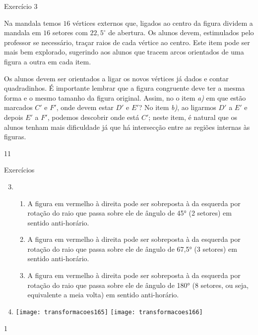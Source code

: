 \begin{sugestions}{Exercício 3}
{
Na mandala temos $16$ vértices externos que, ligados ao centro da figura dividem a mandala em $16$ setores com $22{,}5^{\circ}$ de abertura. Os alunos devem, estimulados pelo professor se necessário, traçar raios de cada vértice ao centro. Este item pode ser mais bem explorado, sugerindo aos alunos que tracem arcos orientados de uma figura a outra em cada item.

Os alunos devem ser orientados a ligar os novos vértices já dados e contar quadradinhos. É importante lembrar que a figura congruente deve ter a mesma forma e o mesmo tamanho da figura original. Assim, no o item \textit{a)} em que estão marcados $C'$ e $F'$, onde devem estar $D'$ e $E'$? No item \textit{b)}, ao ligarmos $D'$ a $E'$ e depois $E'$ a $F'$, podemos descobrir onde está $C'$; neste item, é natural que os alunos tenham mais dificuldade já que há intersecção entre as regiões internas às figuras.
}{1}{1}
\end{sugestions}
\begin{answer}{Exercícios}
{\exerciselist
\begin{enumerate}\setcounter{enumi}{2}
\item 
\begin{enumerate}[label=\textit{\alph*)}, topsep=5pt, itemsep=2.5pt]
\item A figura em vermelho à direita pode ser sobreposta à da esquerda por rotação do raio que passa sobre ele de ângulo de 45° (2 setores) em sentido anti-horário. 
\item A figura em vermelho à direita pode ser sobreposta à da esquerda por rotação do raio que passa sobre ele de ângulo de 67,5° (3 setores) em sentido anti-horário. 
\item A figura em vermelho à direita pode ser sobreposta à da esquerda por rotação do raio que passa sobre ele de ângulo de 180° (8 setores, ou seja, equivalente a meia volta) em sentido anti-horário.
\end{enumerate}

\item {}
{
\texttt{[image: transformacoes165]}
\texttt{[image: transformacoes166]}
}

\end{enumerate}
}{1}
\end{answer}
\clearmargin

